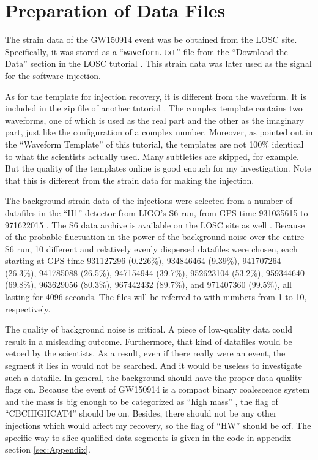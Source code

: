 \documentclass[aps,prd,preprint]{revtex4}
\begin{document}
\section{Preparation of Data Files \label{sec:dataFile}}
The strain data of the GW150914 event was be obtained from the LOSC site. Specifically, it was stored as a \enquote{\texttt{waveform.txt}} file from the \enquote{Download the Data} section in the LOSC tutorial \cite{GWTutorial}. This strain data was later used as the signal for the software injection.
\par As for the template for injection recovery, it is different from the waveform. It is included in the zip file of another tutorial \cite{GWTutorial2}. The complex template contains two waveforms, one of which is used as the real part and the other as the imaginary part, just like the configuration of a complex number. Moreover, as pointed out in the \enquote{Waveform Template} of this tutorial, the templates are not 100\% identical to what the scientists actually used. Many subtleties are skipped, for example. But the quality of the templates online is good enough for my investigation. Note that this is different from the strain data for making the injection.
\par The background strain data of the injections were selected from a number of datafiles in the \enquote{H1} detector from LIGO's S6 run, from GPS time 931035615 to 971622015 \cite{TimeConvert1,TimeConvert2}. The S6 data archive is available on the LOSC site as well \cite{S6Data}. Because of the probable fluctuation in the power of the background noise over the entire S6 run, 10 different and relatively evenly dispersed datafiles were chosen, each starting at GPS time 931127296 (0.226\%), 934846464 (9.39\%), 941707264 (26.3\%), 941785088 (26.5\%), 947154944 (39.7\%), 952623104 (53.2\%), 959344640 (69.8\%), 963629056 (80.3\%), 967442432 (89.7\%), and 971407360 (99.5\%), all lasting for 4096 seconds. The files will be referred to with numbers from 1 to 10, respectively.
\par The quality of background noise is critical. A piece of low-quality data could result in a misleading outcome. Furthermore, that kind of datafiles would be vetoed by the scientists. As a result, even if there really were an event, the segment it lies in would not be searched. And it would be useless to investigate such a datafile. In general, the background should have the proper data quality flags on. Because the event of GW150914 is a compact binary coalescence system \cite{O1} and the mass is big enough to be categorized as \enquote{high mass} \cite{S6himass}, the flag of \enquote{CBCHIGH\textunderscore CAT4} should be on. Besides, there should not be any other injections which would affect my recovery, so the flag of \enquote{HW} should be off. \cite{S6DQ} The specific way to slice qualified data segments is given in the code in appendix section \ref{sec:Appendix}.
\end{document}
